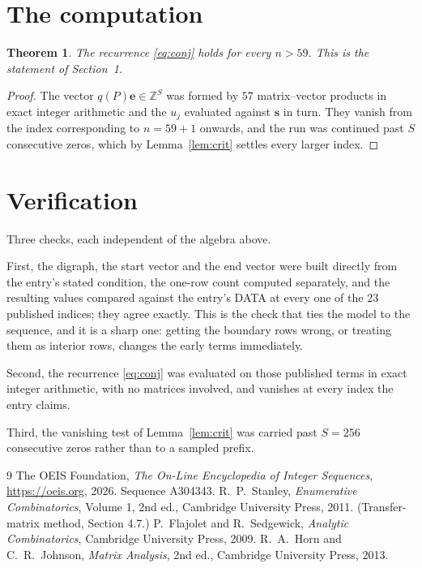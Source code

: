 \documentclass[11pt,a4paper]{article}
\theoremstyle{plain}
\newtheorem{theorem}{Theorem}
\theoremstyle{definition}
\begin{document}
\section{The computation}

\begin{theorem}
The recurrence \eqref{eq:conj} holds for every $n>59$. This is the statement of
Section~1.
\end{theorem}

\begin{proof}
The vector $q(P)\mathbf{e}\in\mathbb{Z}^{S}$ was formed by $57$ matrix--vector
products in exact integer arithmetic and the $u_j$ evaluated against $\mathbf{s}$ in turn.
They vanish from the index corresponding to $n=59+1$ onwards, and the run was continued
past $S$ consecutive zeros, which by Lemma~\ref{lem:crit} settles every larger index.
\end{proof}

\section{Verification}

Three checks, each independent of the algebra above.

First, the digraph, the start vector and the end vector were built directly from the
entry's stated condition, the one-row count computed separately, and the resulting values
compared against the entry's DATA at every one of the $23$ published indices; they
agree exactly. This is the check that ties the model to the sequence, and it is a sharp one:
getting the boundary rows wrong, or treating them as interior rows, changes the early terms
immediately.

Second, the recurrence \eqref{eq:conj} was evaluated on those published terms in exact
integer arithmetic, with no matrices involved, and vanishes at every index the entry claims.

Third, the vanishing test of Lemma~\ref{lem:crit} was carried past $S=256$ consecutive
zeros rather than to a sampled prefix.

\begin{thebibliography}{9}
 The OEIS Foundation, \emph{The On-Line Encyclopedia of Integer
Sequences}, \url{https://oeis.org}, 2026. Sequence A304343.
 R.~P.~Stanley, \emph{Enumerative Combinatorics}, Volume 1, 2nd ed.,
Cambridge University Press, 2011. (Transfer-matrix method, Section 4.7.)
 P.~Flajolet and R.~Sedgewick, \emph{Analytic Combinatorics}, Cambridge
University Press, 2009.
 R.~A.~Horn and C.~R.~Johnson, \emph{Matrix Analysis}, 2nd ed., Cambridge
University Press, 2013.
\end{thebibliography}
\end{document}
